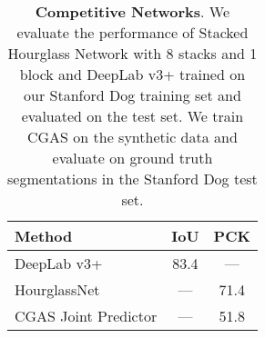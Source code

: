 \begin{table}[]
\centering
\begin{tabular}{@{}lcc@{}}
\toprule
\multicolumn{1}{l}{Method} & 
\multicolumn{1}{c}{IoU} & 
\multicolumn{1}{c}{PCK} 
\\ 
\midrule
DeepLab v3+ & 83.4 & --- \\
HourglassNet & --- & 71.4 \\
CGAS Joint Predictor & --- & 51.8 \\
\bottomrule 
\end{tabular}
\vspace{1em}
\caption{\label{tab:othernetworks}\textbf{Competitive Networks}. We evaluate the performance of Stacked Hourglass Network with 8 stacks and 1 block and DeepLab v3+ trained on our Stanford Dog training set and evaluated on the test set. We train CGAS on the synthetic data and evaluate on ground truth segmentations in the Stanford Dog test set.}
\end{table}